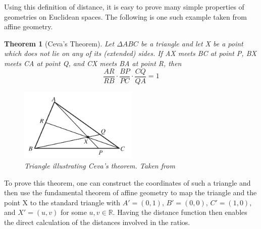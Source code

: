 \documentclass[a4paper, 12pt]{article}
\newtheorem*{theorem}{Theorem}
\newcommand{\R}{\mathbb{R}}
\begin{document}
Using this definition of distance, it is easy to prove many simple properties of geometries on Euclidean spaces. The following is one such example taken from affine geometry.
\begin{theorem}[Ceva's Theorem]
  Let $\Delta ABC$ be a triangle and let X be a point which does not lie on any of its (extended) sides. If AX meets BC at point P, BX meets CA at point Q, and CX meets BA at point R, then
  \begin{equation*}
    \frac{AR}{RB}\cdot\frac{BP}{PC}\cdot\frac{CQ}{QA} = 1
  \end{equation*}
  \begin{figure}[!hbt]
    \centering
    \includegraphics[width=0.5\textwidth]{CevasTheorem}
    \caption{Triangle illustrating Ceva's theorem. Taken from \cite{brannan}}
    \label{fig:Ceva}
  \end{figure}
\end{theorem}

To prove this theorem, one can construct the coordinates of such a triangle and then use the fundamental theorem of affine geometry to map the triangle and the point X to the standard triangle with $A'=(0,1)$, $B'=(0,0)$, $C'=(1,0)$, and $X'=(u,v)$ for some $u,v\in\R$. Having the distance function then enables the direct calculation of the distances involved in the ratios.
\end{document}
